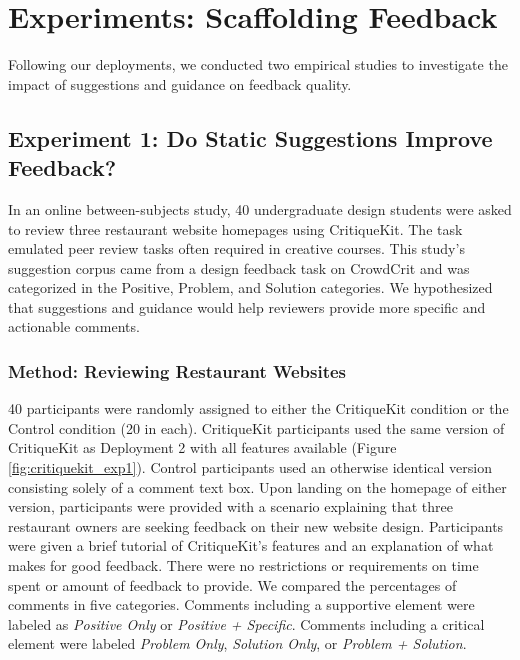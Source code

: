 \section{Experiments: Scaffolding Feedback}
\label{sec:critiquekit_exp}
Following our deployments, we conducted two empirical studies to investigate the impact of suggestions and guidance on feedback quality.

\subsection{Experiment 1: Do Static Suggestions Improve Feedback?}
In an online between-subjects study, 40 undergraduate design students were asked to review three restaurant website homepages using CritiqueKit. The task emulated peer review tasks often required in creative courses. This study's suggestion corpus came from a design feedback task on CrowdCrit \cite{Luther2015} and was categorized in the Positive, Problem, and Solution categories. We hypothesized that suggestions and guidance would help reviewers provide more specific and actionable comments.

\subsubsection{Method: Reviewing Restaurant Websites}
40 participants were randomly assigned to either the CritiqueKit condition or the Control condition (20 in each). CritiqueKit participants used the same version of CritiqueKit as Deployment 2 with all features available (Figure \ref{fig:critiquekit_exp1}). Control participants used an otherwise identical version consisting solely of a comment text box. Upon landing on the homepage of either version, participants were provided with a scenario explaining that three restaurant owners are seeking feedback on their new website design. Participants were given a brief tutorial of CritiqueKit's features and an explanation of what makes for good feedback. There were no restrictions or requirements on time spent or amount of feedback to provide. We compared the percentages of comments in five categories. Comments including a supportive element were labeled as \textit{Positive Only} or \textit{Positive + Specific}. Comments including a critical element were labeled \textit{Problem Only}, \textit{Solution Only}, or \textit{Problem + Solution}.

